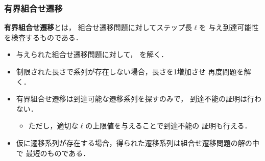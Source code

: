 \documentclass[dvipdfmx,11pt]{beamer}
\begin{document}
\begin{frame}\frametitle{有界組合せ遷移}

  \begin{alertblock}{}
    \alert{\bf 有界組合せ遷移}とは，
    組合せ遷移問題に対してステップ長$\ell$を
    与え到達可能性を検査するものである．
  \end{alertblock}

  \begin{itemize}
    \item 与えられた組合せ遷移問題に対して，
          を解く．
    \item 制限された長さで系列が存在しない場合，長さを1増加させ
          再度問題を解く．
    \item 有界組合せ遷移は到達可能な遷移系列を探すのみで，
          到達不能の証明は行わない．
          \begin{itemize}
            \item ただし，適切な$\ell$の上限値を与えることで到達不能の
                  証明も行える．
          \end{itemize}
    \item 仮に遷移系列が存在する場合，得られた遷移系列は組合せ遷移問題の解の中で
          最短のものである．
  \end{itemize}

\end{frame}
\end{document}
